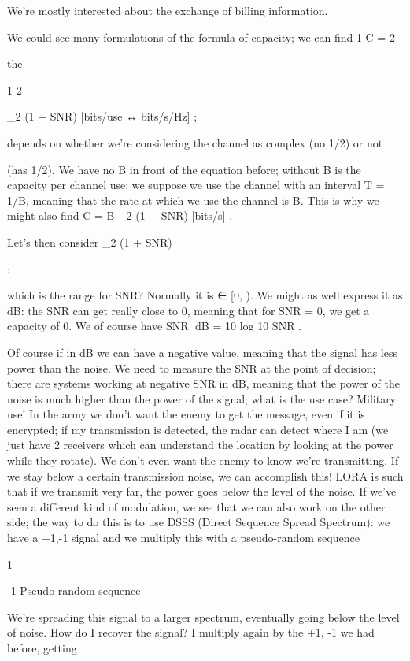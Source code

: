 {{{{{We're mostly interested about the exchange of billing information.

We could see many formulations of the formula of capacity; we can find 1 C =
2

the

1 2

\log_2 (1 + SNR) [bits/use ↔ bits/s/Hz] ;

depends on whether we're considering the channel as complex (no 1/2) or not

(has 1/2). We have no B in front of the equation before; without B is the capacity per channel use; we suppose we use the channel with an interval T = 1/B, meaning that the rate at which we use the channel is B.
This is why we might also find C = B \log_2 (1 + SNR) [bits/s] .

Let's then consider
\log_2 (1 + SNR)

:

which is the range for SNR? Normally it is ∈ [0, \infty).
We might as well express it as dB: the SNR can get really close to 0, meaning that for SNR = 0, we get a capacity of 0.
We of course have SNR| dB = 10 log 10 SNR .

Of course if in dB we can have a negative value, meaning that the signal has less power than the noise.
We need to measure the SNR at the point of decision; there are systems working at negative SNR in dB, meaning that the power of the noise is much higher than the power of the signal; what is the use case? Military use! In the army we don't want the enemy to get the message, even if it is encrypted; if my transmission is detected, the radar can detect where I am (we just have 2 receivers which can understand the location by looking at the power while they rotate). We don't even want the enemy to know we're transmitting. If we stay below a certain transmission noise, we can accomplish this!
LORA is such that if we transmit very far, the power goes below the level of the noise.
If we've seen a different kind of modulation, we see that we can also work on the other side; the way to do this is to use DSSS (Direct Sequence Spread Spectrum): we have a
+1,-1 signal and we multiply this with a pseudo-random sequence

1

-1 Pseudo-random sequence

We're spreading this signal to a larger spectrum, eventually going below the level of noise. How do I recover the signal? I multiply again by the +1, -1 we had before, getting

}}}}}
